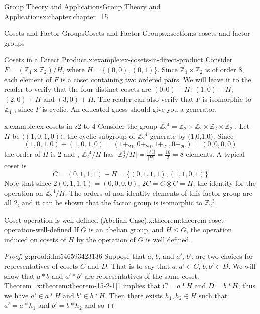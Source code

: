 \documentclass[oneside,10pt,]{book}
\newcommand{\xreffont}{\relax}
\numberwithin{equation}{section}
\begin{document}
\begin{chapterptx}{Group Theory and Applications}{}{Group Theory and Applications}{}{}{x:chapter:chapter_15}
\begin{sectionptx}{Cosets and Factor Groups}{}{Cosets and Factor Groups}{}{}{x:section:s-cosets-and-factor-groups}
\begin{example}{Cosets in a Direct Product.}{x:example:ex-cosets-in-direct-product}%
Consider \(F = (\mathbb{Z}_4\times  \mathbb{Z}_2 )/H\), where \(H=\{(0,0),(0,1)\}\). Since \(\mathbb{Z}_4 \times \mathbb{Z}_2\) is of order 8, each element of \(F\) is a coset containing two ordered pairs. We will leave it to the reader to verify that the four distinct cosets are \((0, 0)+H\),  \((1,0) +H\), \((2, 0)+H\) and  \((3, 0)+H\). The reader can also verify that \(F\) is isomorphic to \(\mathbb{Z}_4\) , since \(F\) is cyclic. An educated guess should give you a generator.%
\end{example}
\begin{example}{}{x:example:ex-cosets-in-z2-to-4}%
Consider the group \(\mathbb{Z}_2{}^4 = \mathbb{Z}_2\times \mathbb{Z}_2\times \mathbb{Z}_2\times \mathbb{Z}_2\) . Let \(H\) be \(\langle (1,0,1, 0)\rangle\), the cyclic subgroup of \(\mathbb{Z}_2{}^4\) generate by (1,0,1,0). Since%
\begin{equation*}
(1,0,1, 0)+(1,0,1, 0)=(1+_21,0+_20,1+_21,0+_20) = (0,0,0,0)
\end{equation*}
the order of \(H\) is 2 and , \(\mathbb{Z}_2{}^4/H\) has \(\lvert \mathbb{Z}_2^4 /H\rvert =\frac{\lvert
\mathbb{Z}_2^4\rvert }{\lvert H\rvert }=\frac{16}{2}= 8\) elements. A typical coset is%
\begin{equation*}
C = (0, 1, 1, 1)+H = \{(0, 1, 1, 1), (1, 1, 0, 1)\}
\end{equation*}
Note that since \(2(0, 1, 1, 1) = (0, 0, 0, 0)\), \(2C = C\otimes C = H\), the identity for the operation on  \(\mathbb{Z}_2{}^4/H\). The orders of non-identity elements of this factor group are all 2, and it can be shown that the factor group is isomorphic to \(\mathbb{Z}_2{}^3\).%
\end{example}
\begin{theorem}{Coset operation is well-defined (Abelian Case).}{}{x:theorem:theorem-coset-operation-well-defined}%
If \(G\) is an abelian group, and \(H \leq  G\), the operation induced on cosets of \(H\) by the operation of \(G\) is well defined.%
\end{theorem}
\begin{proof}{}{g:proof:idm546593423136}
Suppose that \(a\), \(b\), and \(a'\), \(b'\).  are two choices for representatives of cosets \(C\) and \(D\). That is to say that \(a, a' \in  C\), \(b, b' \in D\). We will show that \(a*b\) and \(a'*b'\) are representatives of the same coset. \hyperref[x:theorem:theorem-15-2-1]{Theorem~{\xreffont\ref{x:theorem:theorem-15-2-1}}}1 implies that \(C = a*H\) and \(D = b*H\), thus we have \(a' \in  a*H\) and \(b' \in  b*H\).  Then there exists \(h_1, h_2 \in  H\) such that  \(a' = a*h_1\)   and \(b' = b*h_2\)  and so%

\end{proof}
\end{sectionptx}
\end{chapterptx}
\end{document}
